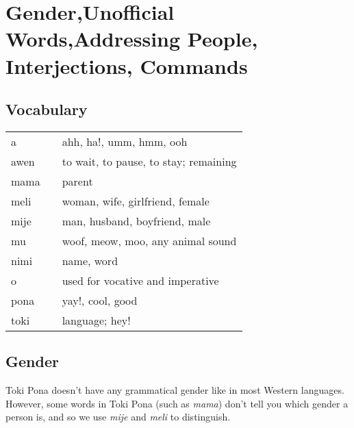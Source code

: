 \section{Gender,Unofficial Words,Addressing People,\\Interjections, Commands} 
%
\subsection*{Vocabulary}
%
\begin{supertabular}{p{5,5cm}|ll}
a && ahh, ha!, umm, hmm, ooh \\
awen && to wait, to pause, to stay; remaining       \\
mama && parent \\
meli && woman, wife, girlfriend, female \\
mije && man, husband, boyfriend, male \\
mu && woof, meow, moo, any animal sound \\
nimi && name, word \\
o && used for vocative and imperative \\
pona && yay!, cool, good \\
toki && language; hey! \\
\end{supertabular}  
%
\subsection*{Gender}
%
Toki Pona doesn't have any grammatical gender like in most Western languages.  
However, some words in Toki Pona (such as \textit{mama}) don't tell you which gender a person is, and so we use \textit{mije} and \textit{meli} to distinguish. 

